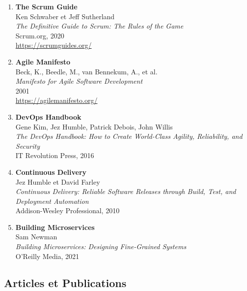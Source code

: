 \begin{enumerate}
    \item \textbf{The Scrum Guide} \\
    Ken Schwaber et Jeff Sutherland \\
    \textit{The Definitive Guide to Scrum: The Rules of the Game} \\
    Scrum.org, 2020 \\
    \url{https://scrumguides.org/}

    \item \textbf{Agile Manifesto} \\
    Beck, K., Beedle, M., van Bennekum, A., et al. \\
    \textit{Manifesto for Agile Software Development} \\
    2001 \\
    \url{https://agilemanifesto.org/}

    \item \textbf{DevOps Handbook} \\
    Gene Kim, Jez Humble, Patrick Debois, John Willis \\
    \textit{The DevOps Handbook: How to Create World-Class Agility, Reliability, and Security} \\
    IT Revolution Press, 2016

    \item \textbf{Continuous Delivery} \\
    Jez Humble et David Farley \\
    \textit{Continuous Delivery: Reliable Software Releases through Build, Test, and Deployment Automation} \\
    Addison-Wesley Professional, 2010

    \item \textbf{Building Microservices} \\
    Sam Newman \\
    \textit{Building Microservices: Designing Fine-Grained Systems} \\
    O'Reilly Media, 2021
\end{enumerate}

\subsection{Articles et Publications}

